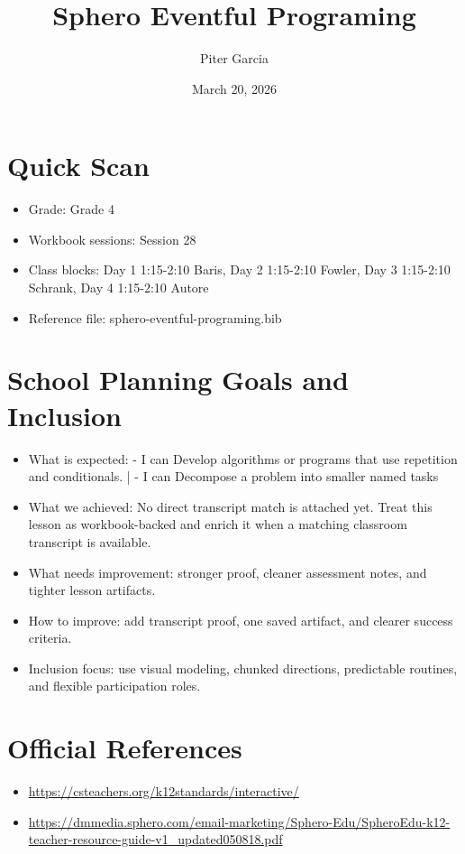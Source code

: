 \documentclass[11pt]{article}
\title{Sphero Eventful Programing}
\author{Piter Garcia}
\date{March 20, 2026}
\begin{document}
    \maketitle
    \section*{Quick Scan}
    \begin{itemize}[leftmargin=*]
    \item Grade: Grade 4
    \item Workbook sessions: Session 28
    \item Class blocks: Day 1 1:15-2:10 Baris, Day 2 1:15-2:10 Fowler, Day 3 1:15-2:10 Schrank, Day 4 1:15-2:10 Autore
    \item Reference file: sphero-eventful-programing.bib
    \end{itemize}
    \section*{School Planning Goals and Inclusion}
    \begin{itemize}[leftmargin=*]
    \item What is expected: - I can Develop algorithms or programs that use repetition and conditionals. | - I can Decompose a problem into smaller named tasks
    \item What we achieved: No direct transcript match is attached yet. Treat this lesson as workbook-backed and enrich it when a matching classroom transcript is available.
    \item What needs improvement: stronger proof, cleaner assessment notes, and tighter lesson artifacts.
    \item How to improve: add transcript proof, one saved artifact, and clearer success criteria.
    \item Inclusion focus: use visual modeling, chunked directions, predictable routines, and flexible participation roles.
    \end{itemize}
    \section*{Official References}
    \begin{itemize}[leftmargin=*]
    \item \url{https://csteachers.org/k12standards/interactive/}
\item \url{https://dmmedia.sphero.com/email-marketing/Sphero-Edu/SpheroEdu-k12-teacher-resource-guide-v1_updated050818.pdf}

    \end{itemize}
    
\end{document}
